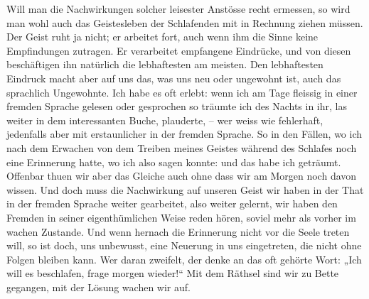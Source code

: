 {Will man die Nachwirkungen solcher leisester Anstösse recht ermessen, so wird man wohl auch das Geistesleben der Schlafenden mit in Rechnung ziehen müssen. Der Geist ruht ja nicht; er arbeitet fort, auch wenn ihm die Sinne keine Empfindungen zutragen. Er verarbeitet empfangene Eindrücke, und von diesen beschäftigen ihn natürlich die lebhaftesten am meisten. Den lebhaftesten Eindruck macht aber auf uns das, was uns neu oder ungewohnt ist, auch das sprachlich Ungewohnte. Ich habe es oft erlebt: wenn ich am Tage fleissig in einer fremden Sprache gelesen oder gesprochen  so träumte ich des Nachts in ihr, las weiter in dem interessanten Buche, plauderte, – wer weiss wie fehlerhaft, jedenfalls aber mit erstaunlicher  in der fremden Sprache. So in den Fällen, wo ich nach dem Erwachen von dem Treiben meines Geistes während des Schlafes noch eine Erinnerung hatte, wo ich also sagen konnte:  und das habe ich geträumt. Offenbar thuen wir aber das Gleiche auch ohne dass wir am Morgen noch davon wissen. Und doch muss die Nachwirkung auf unseren Geist  wir haben in der That in der fremden Sprache weiter gearbeitet, also weiter gelernt, wir haben den Fremden in seiner eigenthümlichen Weise reden hören, soviel mehr als vorher im wachen Zustande. Und wenn hernach die Erinnerung nicht vor die Seele treten will, so ist doch, uns unbewusst, eine Neuerung in uns eingetreten, die nicht ohne Folgen bleiben kann. Wer daran zweifelt, der denke an das oft gehörte Wort: „Ich will es beschlafen, frage morgen wieder!“ Mit dem Räthsel sind wir zu Bette gegangen, mit der Lösung wachen wir auf.

\label{sp.276}

}
